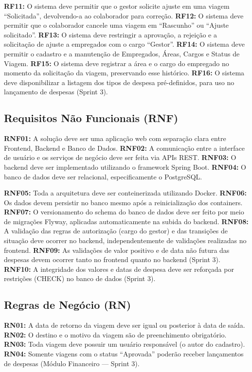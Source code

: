 \documentclass[12pt,article,oneside,a4paper]{abntex2}
\begin{document}
\textbf{RF11:} O sistema deve permitir que o gestor solicite ajuste em uma
viagem ``Solicitada'', devolvendo-a ao colaborador para correção.
\textbf{RF12:} O sistema deve permitir que o colaborador cancele uma viagem
em ``Rascunho'' ou ``Ajuste solicitado''.
\textbf{RF13:} O sistema deve restringir a aprovação, a rejeição e a
solicitação de ajuste a empregados com o cargo ``Gestor''.
\textbf{RF14:} O sistema deve permitir o cadastro e a manutenção de
Empregados, Áreas, Cargos e Status de Viagem.
\textbf{RF15:} O sistema deve registrar a área e o cargo do empregado no
momento da solicitação da viagem, preservando esse histórico.
\textbf{RF16:} O sistema deve disponibilizar a listagem dos tipos de despesa
pré-definidos, para uso no lançamento de despesas (Sprint 3).

\subsection{Requisitos Não Funcionais (RNF)}

\textbf{RNF01:} A solução deve ser uma aplicação web com separação clara
entre Frontend, Backend e Banco de Dados.
\textbf{RNF02:} A comunicação entre a interface de usuário e os serviços de
negócio deve ser feita via APIs REST.
\textbf{RNF03:} O backend deve ser implementado utilizando o framework
Spring Boot.
\textbf{RNF04:} O banco de dados deve ser relacional, especificamente o
PostgreSQL.

\textbf{RNF05:} Toda a arquitetura deve ser conteinerizada utilizando
Docker.
\textbf{RNF06:} Os dados devem persistir no banco mesmo após a
reinicialização dos containers.
\textbf{RNF07:} O versionamento do schema do banco de dados deve ser feito
por meio de migrações Flyway, aplicadas automaticamente na subida do
backend.
\textbf{RNF08:} A validação das regras de autorização (cargo do gestor) e
das transições de situação deve ocorrer no backend, independentemente de
validações realizadas no frontend.
\textbf{RNF09:} As validações de valor positivo e de data não futura das
despesas devem ocorrer tanto no frontend quanto no backend (Sprint 3).
\textbf{RNF10:} A integridade dos valores e datas de despesa deve ser
reforçada por restrições (CHECK) no banco de dados (Sprint 3).

\subsection{Regras de Negócio (RN)}

\textbf{RN01:} A data de retorno da viagem deve ser igual ou posterior à
data de saída.
\textbf{RN02:} O destino e o motivo da viagem são de preenchimento
obrigatório.
\textbf{RN03:} Toda viagem deve possuir um usuário responsável (o autor do
cadastro).
\textbf{RN04:} Somente viagens com o status ``Aprovada'' poderão receber
lançamentos de despesas (Módulo Financeiro --- Sprint 3).
\end{document}
